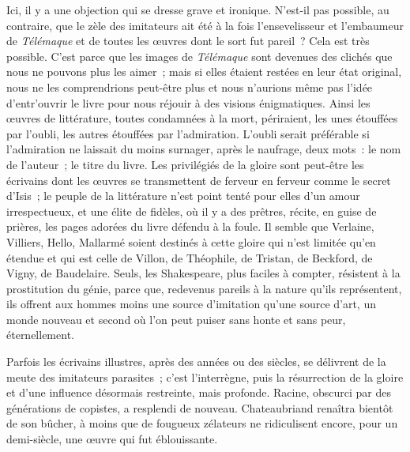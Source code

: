 \documentclass[french,twoside]{book} %
\begin{document}
Ici, il y a une objection qui se dresse grave et ironique. N’est-il pas possible, au contraire, que le zèle des imitateurs ait été à la fois l’ensevelisseur et l’embaumeur de {\itshape Télémaque} et de toutes les œuvres dont le sort fut pareil ? Cela est très possible. C’est parce que les images de {\itshape Télémaque} sont devenues des clichés que nous ne pouvons plus les aimer ; mais si elles étaient restées en leur état original, nous ne les comprendrions peut-être plus et nous n’aurions même pas l’idée d’entr’ouvrir le livre pour nous réjouir à des visions énigmatiques. Ainsi les œuvres de littérature, toutes condamnées à la mort, périraient, les unes étouffées par l’oubli, les autres étouffées par l’admiration. L’oubli serait préférable si l’admiration ne laissait du moins surnager, après le naufrage, deux mots : le nom de l’auteur ; le titre du livre. Les privilégiés de la gloire sont peut-être les écrivains dont les œuvres se transmettent de ferveur en ferveur comme le secret d’Isis ; le peuple de la littérature n’est point tenté pour elles d’un amour irrespectueux, et une élite de fidèles, où il y a des prêtres, récite, en guise de prières, les pages adorées du livre défendu à la foule. Il semble que Verlaine, Villiers, Hello, Mallarmé soient destinés à cette gloire qui n’est limitée qu’en étendue et qui est celle de Villon, de Théophile, de Tristan, de Beckford, de Vigny, de Baudelaire. Seuls, les Shakespeare, plus faciles à compter, résistent à la prostitution du génie, parce que, redevenus pareils à la nature qu’ils représentent, ils offrent aux hommes moins une source d’imitation qu’une source d’art, un monde nouveau et second où l’on peut puiser sans honte et sans peur, éternellement.\par
Parfois les écrivains illustres, après des années ou des siècles, se délivrent de la meute des imitateurs parasites ; c’est l’interrègne, puis la résurrection de la gloire et d’une influence désormais restreinte, mais profonde. Racine, obscurci par des générations de copistes, a resplendi de nouveau. Chateaubriand renaîtra bientôt de son bûcher, à moins que de fougueux zélateurs ne ridiculisent encore, pour un demi-siècle, une œuvre qui fut éblouissante.\par
\end{document}

